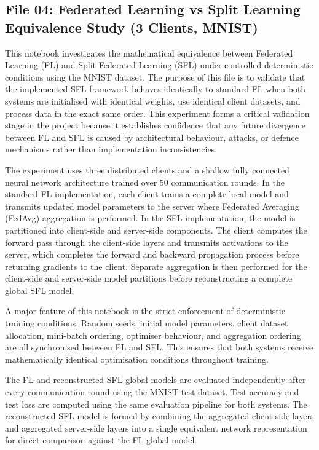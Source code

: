 \subsection*{File 04: Federated Learning vs Split Learning Equivalence Study (3 Clients, MNIST)}

This notebook investigates the mathematical equivalence between Federated Learning (FL) and Split Federated Learning (SFL) under controlled deterministic conditions using the MNIST dataset. The purpose of this file is to validate that the implemented SFL framework behaves identically to standard FL when both systems are initialised with identical weights, use identical client datasets, and process data in the exact same order. This experiment forms a critical validation stage in the project because it establishes confidence that any future divergence between FL and SFL is caused by architectural behaviour, attacks, or defence mechanisms rather than implementation inconsistencies.

The experiment uses three distributed clients and a shallow fully connected neural network architecture trained over 50 communication rounds. In the standard FL implementation, each client trains a complete local model and transmits updated model parameters to the server where Federated Averaging (FedAvg) aggregation is performed. In the SFL implementation, the model is partitioned into client-side and server-side components. The client computes the forward pass through the client-side layers and transmits activations to the server, which completes the forward and backward propagation process before returning gradients to the client. Separate aggregation is then performed for the client-side and server-side model partitions before reconstructing a complete global SFL model.

A major feature of this notebook is the strict enforcement of deterministic training conditions. Random seeds, initial model parameters, client dataset allocation, mini-batch ordering, optimiser behaviour, and aggregation ordering are all synchronised between FL and SFL. This ensures that both systems receive mathematically identical optimisation conditions throughout training.

The FL and reconstructed SFL global models are evaluated independently after every communication round using the MNIST test dataset. Test accuracy and test loss are computed using the same evaluation pipeline for both systems. The reconstructed SFL model is formed by combining the aggregated client-side layers and aggregated server-side layers into a single equivalent network representation for direct comparison against the FL global model.

